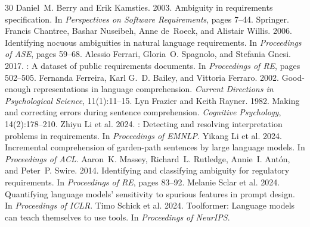 \documentclass[11pt]{article}
\begin{document}
\begin{thebibliography}{30}
Daniel~M. Berry and Erik Kamsties. 2003.
\newblock Ambiguity in requirements specification.
\newblock In \emph{Perspectives on Software Requirements}, pages 7--44. Springer.
%
Francis Chantree, Bashar Nuseibeh, Anne de~Roeck, and Alistair Willis. 2006.
\newblock Identifying nocuous ambiguities in natural language requirements.
\newblock In \emph{Proceedings of ASE}, pages 59--68.
%
Alessio Ferrari, Gloria~O. Spagnolo, and Stefania Gnesi. 2017.
: A dataset of public requirements documents.
\newblock In \emph{Proceedings of RE}, pages 502--505.
%
Fernanda Ferreira, Karl G.~D. Bailey, and Vittoria Ferraro. 2002.
\newblock Good-enough representations in language comprehension.
\newblock \emph{Current Directions in Psychological Science}, 11(1):11--15.
%
Lyn Frazier and Keith Rayner. 1982.
\newblock Making and correcting errors during sentence comprehension.
\newblock \emph{Cognitive Psychology}, 14(2):178--210.
%
Zhiyu Li et al. 2024.
: Detecting and resolving interpretation problems in requirements.
\newblock In \emph{Proceedings of EMNLP}.
%
Yikang Li et al. 2024.
\newblock Incremental comprehension of garden-path sentences by large language models.
\newblock In \emph{Proceedings of ACL}.
%
Aaron~K. Massey, Richard~L. Rutledge, Annie~I. Ant\'{o}n, and Peter~P. Swire. 2014.
\newblock Identifying and classifying ambiguity for regulatory requirements.
\newblock In \emph{Proceedings of RE}, pages 83--92.
%
Melanie Sclar et al. 2024.
\newblock Quantifying language models' sensitivity to spurious features in prompt design.
\newblock In \emph{Proceedings of ICLR}.
%
Timo Schick et al. 2024.
\newblock Toolformer: Language models can teach themselves to use tools.
\newblock In \emph{Proceedings of NeurIPS}.
%

\end{thebibliography}
\end{document}
